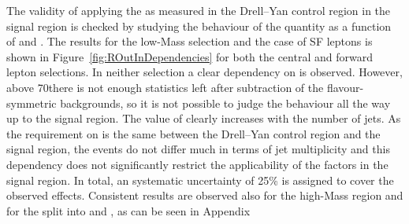 
The validity of applying the \Routin as measured in the Drell--Yan control region in the signal region is checked by studying the behaviour of the quantity as a function of \MET and \njets. The results for the low-Mass selection and the case of SF leptons is shown in Figure~\ref{fig:ROutInDependencies} for both the central and forward lepton selections. In neither selection a clear dependency on \MET is observed. However, above 70\GeV there is not enough statistics left after subtraction of the flavour-symmetric backgrounds, so it is not possible to judge the behaviour all the way up to the signal region. The value of \Routin clearly increases with the number of jets. As the requirement on \njets is the same between the Drell--Yan control region and the signal region, the events do not differ much in terms of jet multiplicity and this dependency does not significantly restrict the applicability of the \Routin factors in the signal region. In total, an systematic uncertainty of 25\% is assigned to cover the observed effects. Consistent results are observed also for the high-Mass region and for the split into \EE and \MM, as can be seen in Appendix~

